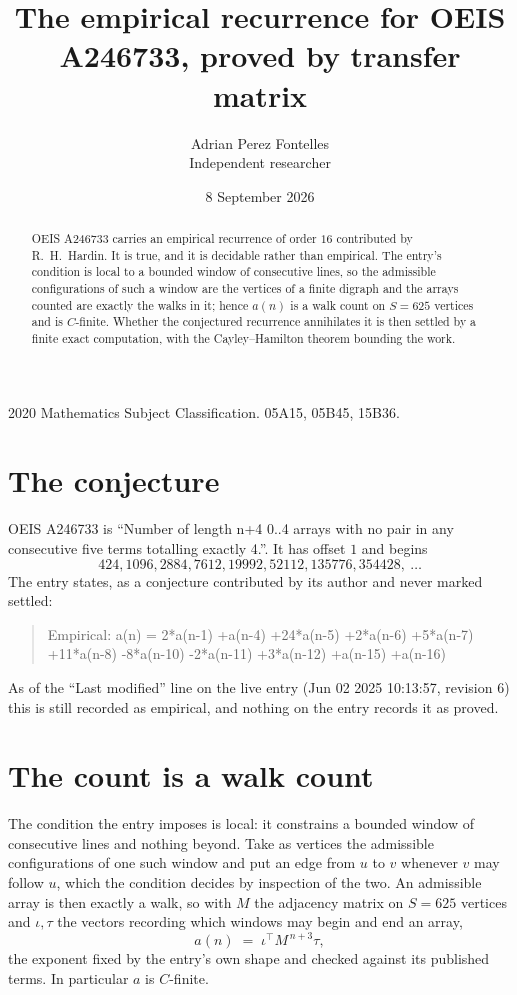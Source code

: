 \documentclass[11pt,a4paper]{article}
\title{The empirical recurrence for OEIS A246733, proved by transfer matrix}
\author{Adrian Perez Fontelles\\ \small Independent researcher}
\date{8 September 2026}
\theoremstyle{plain}
\theoremstyle{definition}
\begin{document}
\maketitle

\begin{abstract}
OEIS A246733 carries an empirical recurrence of order $16$ contributed by R.~H.~Hardin. It is
true, and it is decidable rather than empirical. The entry's condition is local to a bounded window of consecutive lines, so
the admissible configurations of such a window are the vertices of a finite digraph and the
arrays counted are exactly the walks in it; hence $a(n)$ is a walk count on $S=625$ vertices
and is $C$-finite. Whether the conjectured recurrence annihilates it is then settled by a
finite exact computation, with the Cayley--Hamilton theorem bounding the work.
\end{abstract}

\noindent\small 2020 Mathematics Subject Classification. 05A15, 05B45, 15B36.\normalsize

\section{The conjecture}

OEIS A246733 is ``Number of length n+4 0..4 arrays with no pair in any consecutive five terms totalling exactly 4.''. It has offset $1$ and begins
\[
424, 1096, 2884, 7612, 19992, 52112, 135776, 354428,\ \dots
\]
The entry states, as a conjecture contributed by its author and never marked settled:
\begin{quote}
Empirical: a(n) = 2*a(n-1) +a(n-4) +24*a(n-5) +2*a(n-6) +5*a(n-7) +11*a(n-8) -8*a(n-10) -2*a(n-11) +3*a(n-12) +a(n-15) +a(n-16)
\end{quote}
As of the ``Last modified'' line on the live entry (Jun 02 2025 10:13:57, revision 6) this is still
recorded as empirical, and nothing on the entry records it as proved.

\section{The count is a walk count}

The condition the entry imposes is local: it constrains a bounded window of consecutive lines and nothing beyond. Take as
vertices the admissible configurations of one such window and put an edge from $u$ to $v$
whenever $v$ may follow $u$, which the condition decides by inspection of the two. An
admissible array is then exactly a walk, so with $M$ the adjacency matrix on $S=625$ vertices
and $\iota,\tau$ the vectors recording which windows may begin and end an array,
\[
a(n)\;=\;\iota^{\!\top}M^{\,n+3}\tau ,
\]
the exponent fixed by the entry's own shape and checked against its published terms. In
particular $a$ is $C$-finite.
\end{document}
